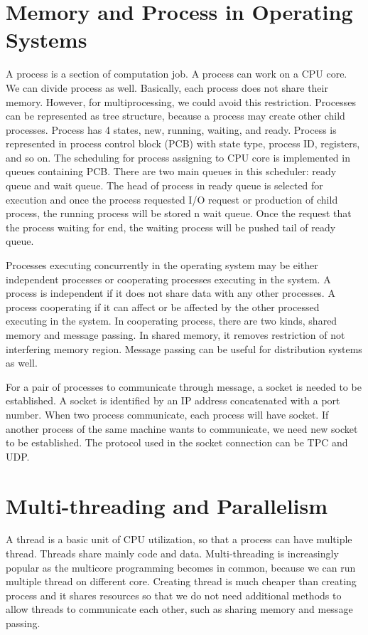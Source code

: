 \section{Memory and Process in Operating Systems}
\label{sec:history}
A process is a section of computation job. A process can work on a CPU core. We can divide process as well.
Basically, each process does not share their memory. However, for multiprocessing, we could avoid this restriction.
Processes can be represented as tree structure, because a process may create other child processes.
Process has 4 states, new, running, waiting, and ready. 
Process is represented in process control block (PCB) with state type, process ID, registers, and so on.
The scheduling for process assigning to CPU core is implemented in queues containing PCB. There are two main queues in this scheduler: 
ready queue and wait queue. The head of process in ready queue is selected for execution and once the process requested I/O request or 
production of child process, the running process will be stored n wait queue. Once the request that the process waiting for end, 
the waiting process will be pushed tail of ready queue. 

Processes executing concurrently in the operating system may be either independent processes or cooperating processes executing in the system.
A process is independent if it does not share data with any other processes. A process cooperating if it can affect or be affected by the 
other processed executing in the system. In cooperating process, there are two kinds, shared memory and message passing. 
In shared memory, it removes restriction of not interfering memory region. Message passing can be useful for distribution systems as well.

For a pair of processes to communicate through message, a socket is needed to be established. 
A socket is identified by an IP address concatenated with a port number. When two process communicate, each process will have socket. 
If another process of the same machine wants to communicate, we need new socket to be established. The protocol used in the socket connection
can be TPC and UDP.

\section{Multi-threading and Parallelism}
\label{sec:history}
A thread is a basic unit of CPU utilization, so that a process can have multiple thread. Threads share mainly code and data. 
Multi-threading is increasingly popular as the multicore programming becomes in common, because we can run multiple thread on different core.
Creating thread is much cheaper than creating process and it shares resources so that we do not need additional methods to allow threads to 
communicate each other, such as sharing memory and message passing.

